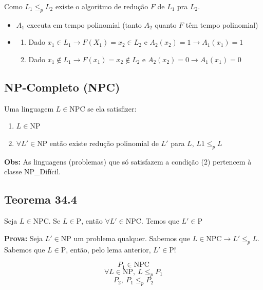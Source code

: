 \documentclass[a4paper,oneside,article,table]{article}
\begin{document}
        Como $L_1 {\leq}_p L_2$ existe o algoritmo de redução $F$ de $L_1$ pra $L_2$.

        \begin{itemize}
            \item $A_1$ executa em tempo polinomial (tanto $A_2$ quanto $F$ têm tempo polinomial)
            \item 
                \begin{enumerate}
                    \item Dado $x_1 \in L_1 \rightarrow F(X_1) = x_2 \in L_2$ e $A_2(x_2) = 1 \rightarrow A_1(x_1) = 1$
                    \item Dado $x_1 \notin L_1 \rightarrow F(x_1) = x_2 \notin L_2$ e $A_2(x_2) = 0 \rightarrow A_1(x_1) = 0$
                \end{enumerate}
        \end{itemize}

        \subsection{NP-Completo (NPC)}
        Uma linguagem $L \in \textrm{NPC}$ se ela satisfizer:
        \begin{enumerate}
            \item $L \in \textrm{NP}$
            \item $\forall L' \in \textrm{NP}$ então existe redução polinomial de $L'$ para $L$, $L1 {\leq}_p L$
        \end{enumerate}

        \textbf{Obs:} As linguagens (problemas) que só satisfazem a condição (2) pertencem à classe NP_Difícil.

        \subsection{Teorema 34.4} Seja $L \in \textrm{NPC}$. Se $L \in \textrm{P}$, então $\forall L' \in \textrm{NPC}$. Temos que $L' \in \textrm{P}$

        \textbf{Prova:} Seja $L' \in \textrm{NP}$ um problema qualquer. Sabemos que $L \in \textrm{NPC} \rightarrow L' {\leq}_p L$.\\
        Sabemos que $L \in \textrm{P}$, então, pelo lema anterior, $L' \in \textrm{P}$! 

        \[P_1 \in \textrm{NPC}\]
        \[\forall L \in \textrm{NP},~L {\leq}_p P_1\]
        \[P_2,~P_1 {\leq}_p P_2\]
\end{document}

